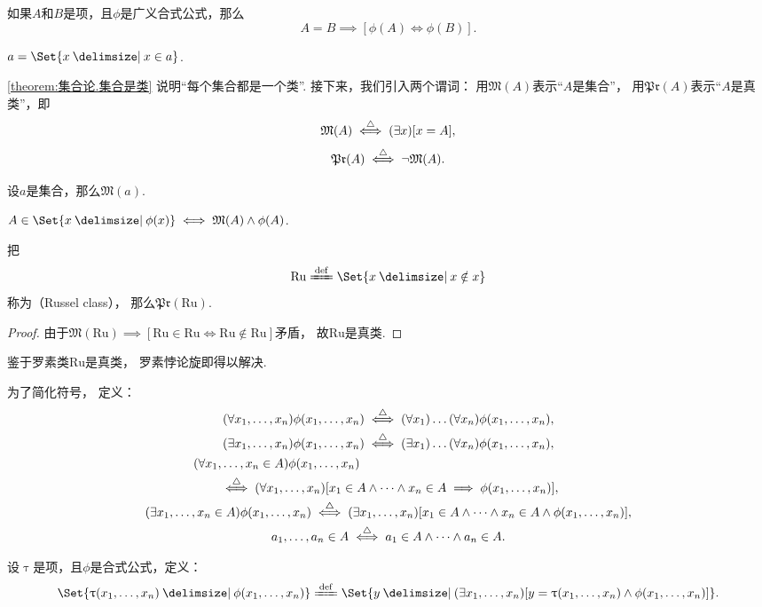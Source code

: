 \begin{theorem}
如果\(A\)和\(B\)是项，且\(\phi\)是广义合式公式，那么\[
	A=B \implies [\phi(A)\iff\phi(B)].
\]
\end{theorem}

\begin{theorem}\label{theorem:集合论.集合是类}
\(a=\Set{ x \given x \in a }\).
\end{theorem}
\cref{theorem:集合论.集合是类} 说明“每个集合都是一个类”.
接下来，我们引入两个谓词：
用\(\mathfrak{M}(A)\)表示“\(A\)是集合”，
用\(\mathfrak{Pr}(A)\)表示“\(A\)是真类”，即\[
	\mathfrak{M}(A) \overset{\triangle}{\iff} (\exists x)[x = A],
\]\[
	\mathfrak{Pr}(A) \overset{\triangle}{\iff} \neg\mathfrak{M}(A).
\]

\begin{theorem}
设\(a\)是集合，那么\(\mathfrak{M}(a)\).
\end{theorem}

\begin{theorem}
\(A \in \Set{ x \given \phi(x) } \iff \mathfrak{M}(A) \land \phi(A)\).
\end{theorem}

\begin{theorem}
\def\Ru{\mathrm{Ru}}
把\[
	\Ru \defeq \Set{ x \given x \notin x }
\]称为{\rm{}（Russel class）}，
那么\(\mathfrak{Pr}(\Ru)\).
\begin{proof}
由于\(\mathfrak{M}(\Ru)
\implies
[\Ru\in\Ru\iff\Ru\notin\Ru]\)矛盾，
故\(\Ru\)是真类.
\end{proof}
\end{theorem}
鉴于罗素类\(\mathrm{Ru}\)是真类，
罗素悖论旋即得以解决.

\begin{definition}
为了简化符号，
\def\x{x_1,\dotsc,x_n}
定义：\begin{gather}
	(\forall\x)\phi(\x)
	\defiff
	(\forall x_1)\dotso(\forall x_n)\phi(\x), \\
	(\exists\x)\phi(\x)
	\defiff
	(\exists x_1)\dotso(\forall x_n)\phi(\x), \\
	\begin{split}
		&\hspace{-20pt}
		(\forall\x\in A)\phi(\x) \\
		&\defiff
		(\forall\x)[x_1\in A \land \dotsb \land x_n\in A \implies \phi(\x)],
	\end{split} \\
	(\exists\x\in A)\phi(\x)
	\defiff
	(\exists\x)[x_1 \in A \land \dotsb \land x_n\in A \land \phi(\x)], \\
	a_1,\dotsc,a_n\in A \defiff a_1\in A \land \dotsb \land a_n\in A.
\end{gather}
\end{definition}

\begin{definition}
\def\x{x_1,\dotsc,x_n}
设\(\uptau\)是项，且\(\phi\)是合式公式，定义：\begin{equation}
	\Set{ \uptau(\x) \given \phi(\x) }
	\defeq
	\Set{ y \given (\exists\x)[y = \uptau(\x) \land \phi(\x)] }.
\end{equation}
\end{definition}

